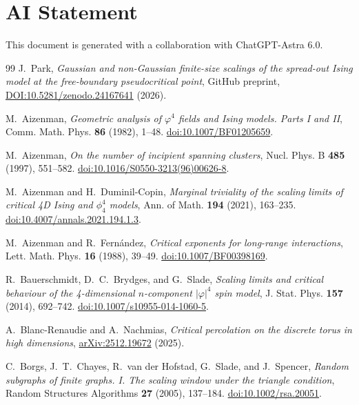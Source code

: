 \documentclass[11pt]{article}
\theoremstyle{definition}
\begin{document}
\section*{AI Statement}

This document is generated with a collaboration with ChatGPT-Astra 6.0.

\begin{thebibliography}{99}
J.~Park, \emph{Gaussian and non-Gaussian finite-size scalings of the
spread-out Ising model at the free-boundary pseudocritical point},
GitHub preprint,
\href{https://github.com/jiwoonGit/phi4/blob/main/FSS/FSS_FBC-obs-extension.pdf}{DOI:10.5281/zenodo.24167641} (2026).

M.~Aizenman, \emph{Geometric analysis of $\varphi^4$ fields and Ising
models. Parts I and II}, Comm. Math. Phys. \textbf{86} (1982), 1--48.
\href{https://doi.org/10.1007/BF01205659}{doi:10.1007/BF01205659}.

M.~Aizenman, \emph{On the number of incipient spanning clusters},
Nucl. Phys. B \textbf{485} (1997), 551--582.
\href{https://doi.org/10.1016/S0550-3213(96)00626-8}{doi:10.1016/S0550-3213(96)00626-8}.

M.~Aizenman and H.~Duminil-Copin, \emph{Marginal triviality of the
scaling limits of critical 4D Ising and $\phi_4^4$ models},
Ann. of Math. \textbf{194} (2021), 163--235.
\href{https://doi.org/10.4007/annals.2021.194.1.3}{doi:10.4007/annals.2021.194.1.3}.

M.~Aizenman and R.~Fern\'andez, \emph{Critical exponents for long-range
interactions}, Lett. Math. Phys. \textbf{16} (1988), 39--49.
\href{https://doi.org/10.1007/BF00398169}{doi:10.1007/BF00398169}.

R.~Bauerschmidt, D.~C.~Brydges, and G.~Slade,
\emph{Scaling limits and critical behaviour of the 4-dimensional
$n$-component $|\varphi|^4$ spin model}, J. Stat. Phys.
\textbf{157} (2014), 692--742.
\href{https://doi.org/10.1007/s10955-014-1060-5}{doi:10.1007/s10955-014-1060-5}.

A.~Blanc-Renaudie and A.~Nachmias,
\emph{Critical percolation on the discrete torus in high dimensions},
\href{https://arxiv.org/abs/2512.19672}{arXiv:2512.19672} (2025).

C.~Borgs, J.~T.~Chayes, R.~van der Hofstad, G.~Slade, and J.~Spencer,
\emph{Random subgraphs of finite graphs. I. The scaling window under the
triangle condition}, Random Structures Algorithms \textbf{27} (2005),
137--184.
\href{https://doi.org/10.1002/rsa.20051}{doi:10.1002/rsa.20051}.


\end{thebibliography}
\end{document}
